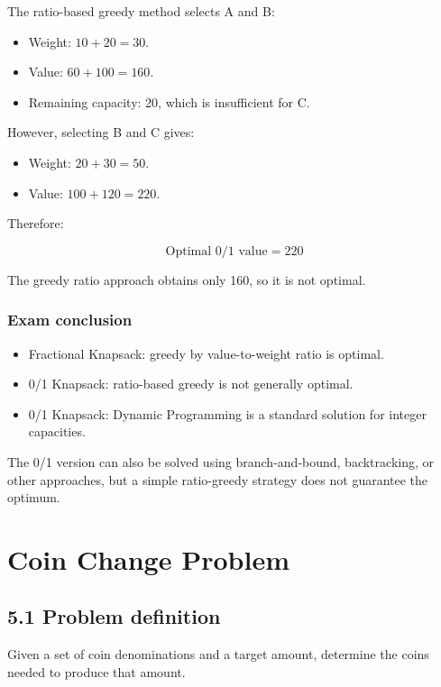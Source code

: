 The ratio-based greedy method selects A and B:

\begin{itemize}
    \item Weight: $10+20=30$.
    \item Value: $60+100=160$.
    \item Remaining capacity: 20, which is insufficient for C.
\end{itemize}

However, selecting B and C gives:

\begin{itemize}
    \item Weight: $20+30=50$.
    \item Value: $100+120=220$.
\end{itemize}

Therefore:


\[
\boxed{\text{Optimal 0/1 value}=220}
\]


The greedy ratio approach obtains only 160, so it is not optimal.

\subsubsection{Exam conclusion}

\begin{itemize}
    \item Fractional Knapsack: greedy by value-to-weight ratio is optimal.
    \item 0/1 Knapsack: ratio-based greedy is not generally optimal.
    \item 0/1 Knapsack: Dynamic Programming is a standard solution for integer capacities.
\end{itemize}

The 0/1 version can also be solved using branch-and-bound, backtracking, or other approaches, but a simple ratio-greedy strategy does not guarantee the optimum.

\section{Coin Change Problem}

\subsection{5.1 Problem definition}

Given a set of coin denominations and a target amount, determine the coins needed to produce that amount.

